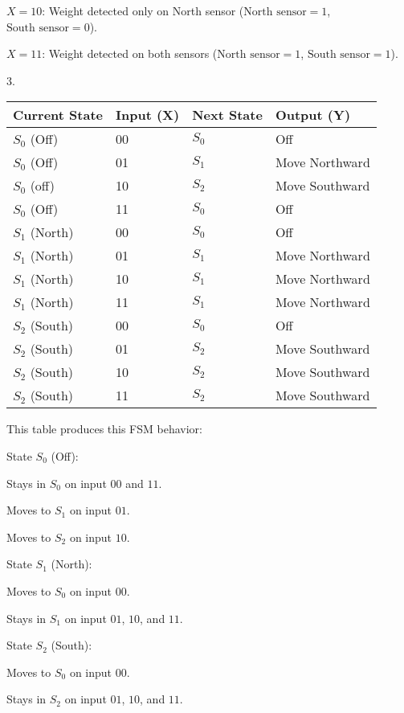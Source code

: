 \documentclass{article}
\begin{document}
$X = 10$: Weight detected only on North sensor ($\text{North sensor} = 1$, $\text{South sensor} = 0$).

$X = 11$: Weight detected on both sensors ($\text{North sensor} = 1$, $\text{South sensor} = 1$).

3.

\begin{table}[htbp]
\centering
\begin{tabular}{@{}llll@{}}
\toprule
Current State & Input (X) & Next State & Output (Y) \\ \midrule
$S_0$ (Off)      & 00          & $S_0$         & Off \\
$S_0$ (Off)      & 01          & $S_1$         & Move Northward \\
$S_0$ (off)      & 10          & $S_2$         & Move Southward \\
$S_0$ (Off)      & 11          & $S_0$         & Off \\
$S_1$ (North)    & 00          & $S_0$         & Off \\
$S_1$ (North)    & 01          & $S_1$         & Move Northward \\
$S_1$ (North)    & 10          & $S_1$         & Move Northward \\
$S_1$ (North)    & 11          & $S_1$         & Move Northward \\
$S_2$ (South)    & 00          & $S_0$         & Off \\
$S_2$ (South)    & 01          & $S_2$         & Move Southward \\
$S_2$ (South)    & 10          & $S_2$         & Move Southward \\
$S_2$ (South)    & 11          & $S_2$         & Move Southward \\ \bottomrule
\end{tabular}
\end{table}

This table produces this FSM behavior:

State $S_0$ (Off):

Stays in $S_0$ on input $00$ and $11$.

Moves to $S_1$ on input $01$.

Moves to $S_2$ on input $10$.

State $S_1$ (North):

Moves to $S_0$ on input $00$.

Stays in $S_1$ on input $01$, $10$, and $11$.

State $S_2$ (South):

Moves to $S_0$ on input $00$.

Stays in $S_2$ on input $01$, $10$, and $11$.
\end{document}
